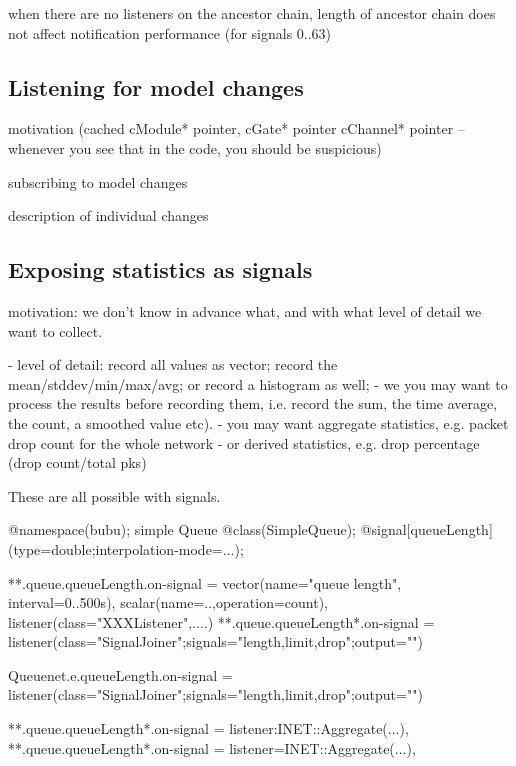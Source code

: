 when there are no listeners on the ancestor chain, length of ancestor chain
does not affect notification performance (for signals 0..63)



\subsection{Listening for model changes}

motivation (cached cModule* pointer, cGate* pointer cChannel* pointer -- whenever you
see that in the code, you should be suspicious)

subscribing to model changes

description of individual changes


\subsection{Exposing statistics as signals}

motivation: we don't know in advance what, and with what level of detail we want to collect.

- level of detail: record all values as vector; record the mean/stddev/min/max/avg;
  or record a histogram as well;
- we you may want to process the results before recording them, i.e. record the sum,
  the time average, the count, a smoothed value etc).
- you may want aggregate statistics, e.g. packet drop count for the whole network
- or derived statistics, e.g. drop percentage (drop count/total pks)

These are all possible with signals.

@namespace(bubu);
simple Queue {
    @class(SimpleQueue);
    @signal[queueLength](type=double;interpolation-mode=...);
}

**.queue.queueLength.on-signal = vector(name="queue length", interval=0..500s), scalar(name=..,operation=count), listener(class="XXXListener",....)
**.queue.queueLength*.on-signal = listener(class="SignalJoiner";signals="length,limit,drop";output="")

Queuenet.e.queueLength.on-signal = listener(class="SignalJoiner";signals="length,limit,drop";output="")

**.queue.queueLength*.on-signal = listener:INET::Aggregate(...),
**.queue.queueLength*.on-signal = listener=INET::Aggregate(...),




